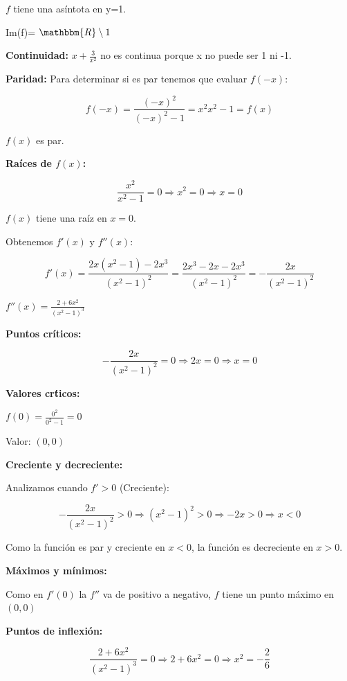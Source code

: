 \documentclass[12pt]{article}
\begin{document}
\begin{enumerate}[\hspace{9px} a)]
        $f$ tiene una as\'intota en y=1.

        Im(f)= $\mathbbm{R}\setminus{1}$

        \textbf{Continuidad:}
        \(x+\displaystyle\frac{3}{x^2}\) no es continua porque x no puede ser 1 ni -1.\medskip

        \textbf{Paridad:}
        Para determinar si es par tenemos que evaluar $f(-x)$:

        \[f(-x)=\displaystyle\frac{(-x)^2}{(-x)^2-1}= {x^2}{x^2-1} = f(x)\]
        
        $f(x)$ es par.\medskip

        \textbf{Ra\'ices de $f(x)$:}\medskip
        
        \[\displaystyle\frac{x^2}{x^2-1}=0 \Rightarrow x^2=0 \Rightarrow x=0\]

        $f(x)$ tiene una ra\'iz en $x=0$.

        Obtenemos $f'(x)$ y $f''(x)$:

        \[f'(x) = \displaystyle\frac{2x(x^2-1)-2x^3}{(x^2-1)^2}=\frac{2x^3-2x-2x^3}{(x^2-1)^2}=-\frac{2x}{(x^2-1)^2}\]

        \(f''(x) = \displaystyle\frac{2+6x^2}{(x^2-1)^3}\)\medskip

        \textbf{Puntos cr\'iticos:}\medskip

        \[\displaystyle-\frac{2x}{(x^2-1)^2} = 0 \Rightarrow 2x=0 \Rightarrow x=0\]

        \textbf{Valores cr\'ticos:}

        \(f(0) = \displaystyle\frac{0^2}{0^2-1} = 0\)\medskip
        
        Valor: $(0,0)$\medskip

        \textbf{Creciente y decreciente:}\medskip

        Analizamos cuando $f'>0$ (Creciente):

        \[\displaystyle-\frac{2x}{(x^2-1)^2}>0 \Rightarrow (x^2-1)^2>0 \Rightarrow -2x>0 \Rightarrow x<0\]

        Como la funci\'on es par y creciente en $x<0$, la funci\'on es decreciente en $x>0$.

        \textbf{M\'aximos y m\'inimos:}\medskip

        Como en $f'(0)$ la $f''$ va de positivo a negativo, $f$ tiene un punto m\'aximo en $(0,0)$\medskip

        \textbf{Puntos de inflexi\'on:}

        \[\displaystyle\frac{2+6x^2}{(x^2-1)^3}=0 \Rightarrow 2+6x^2=0 \Rightarrow x^2=-\frac{2}{6}\]


\end{enumerate}
\end{document}
